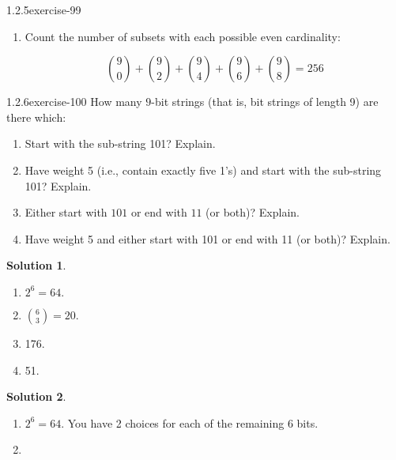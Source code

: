 \documentclass[twoside,11pt,]{book}
\numberwithin{equation}{chapter}
\begin{document}
\begin{divisionsolution}{1.2.5}{}{exercise-99}
\begin{enumerate}[label=(\alph*)]
\item\hypertarget{li-1137}{}\hypertarget{p-1616}{}%
Count the number of subsets with each possible even cardinality:%
\par
\hypertarget{p-1617}{}%
%
\begin{equation*}
{9 \choose 0} + {9 \choose 2} + {9\choose 4} + {9 \choose 6} + {9 \choose 8} = 256
\end{equation*}
%
\end{enumerate}
%
\end{divisionsolution}%
\begin{divisionsolution}{1.2.6}{}{exercise-100}%
\hypertarget{p-1637}{}%
How many \(9\)-bit strings (that is, bit strings of length 9) are there which:\leavevmode%
\begin{enumerate}[label=(\alph*)]
\item\hypertarget{li-1150}{}\hypertarget{p-1638}{}%
Start with the sub-string 101? Explain.%
\item\hypertarget{li-1151}{}\hypertarget{p-1640}{}%
Have weight 5 (i.e., contain exactly five 1's) and start with the sub-string 101? Explain.%
\item\hypertarget{li-1152}{}\hypertarget{p-1642}{}%
Either start with \(101\) or end with \(11\) (or both)? Explain.%
\item\hypertarget{li-1153}{}\hypertarget{p-1644}{}%
Have weight 5 and either start with 101 or end with 11 (or both)? Explain.%
\end{enumerate}
%
\par\smallskip%
\noindent\textbf{Solution 1}.\quad%
\hypertarget{p-1646}{}%
\leavevmode%
\begin{enumerate}[label=(\alph*)]
\item\hypertarget{li-1154}{}\hypertarget{p-1647}{}%
\(2^6 = 64\text{.}\)%
\item\hypertarget{li-1155}{}\hypertarget{p-1648}{}%
\({6 \choose 3} = 20\text{.}\)%
\item\hypertarget{li-1156}{}\hypertarget{p-1649}{}%
176.%
\item\hypertarget{li-1157}{}\hypertarget{p-1650}{}%
51.%
\end{enumerate}
%
\par\smallskip%
\noindent\textbf{Solution 2}.\quad%
\hypertarget{p-1651}{}%
\leavevmode%
\begin{enumerate}[label=(\alph*)]
\item\hypertarget{li-1158}{}\hypertarget{p-1652}{}%
\(2^6 = 64\text{.}\) You have 2 choices for each of the remaining 6 bits.%
\item\hypertarget{li-1159}{}\hypertarget{p-1653}{}%

\end{enumerate}
\end{divisionsolution}
\end{document}
